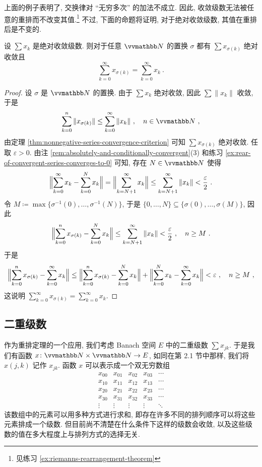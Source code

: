 上面的例子表明了, 交换律对 ``无穷多次'' 的加法不成立. 因此, 收敛级数无法被任意的重排而不改变其值.\footnote{见练习 \ref{ex:riemanns-rearrangement-theorem}} 不过, 下面的命题将证明, 对于绝对收敛级数, 其值在重排后是不变的.

\begin{theorem}\label{thm:rearrangement-theorem}
    设 \(\sum x_k\) 是绝对收敛级数. 则对于任意 \(\N\) 的置换 \(\sigma\) 都有 \(\sum x_{\sigma(k)}\) 绝对收敛且
    \[
        \sum_{k = 0}^\infty x_{\sigma(k)} = \sum_{k = 0}^\infty x_k\ .
    \]
\end{theorem}

\begin{proof}
    设 \(\sigma\) 是 \(\N\) 的置换. 由于 \(\sum x_k\) 绝对收敛, 因此 \(\sum \|x_k\|\) 收敛, 于是
    \[
        \sum_{k = 0}^n \|x_{\sigma(k)}\| \leq \sum_{k = 0}^\infty \|x_k\|\ ,\quad n \in \N\ ,
    \]
    由定理 \ref{thm:nonnegative-series-convergence-criterion} 可知 \(\sum x_{\sigma(k)}\) 绝对收敛. 任取 \(\varepsilon > 0\). 由注 \ref{rem:absolutely-and-conditionally-convergent}(3) 和练习 \ref{ex:rear-of-convergent-series-converges-to-0} 可知, 存在 \(N \in \N\) 使得
    \[
        \Bigl\| \sum_{k = 0}^\infty x_k - \sum_{k = 0}^N x_k \Bigr\| = \Bigl\| \sum_{k = N + 1}^\infty x_k \Bigr\| \leq \sum_{k = N + 1}^\infty \|x_k\| < \frac{\varepsilon}{2}\ .
    \]
    令 \(M \coloneqq \max\bigl\{ \sigma^{- 1}(0), \ldots, \sigma^{- 1}(N) \bigr\}\), 于是 \(\{0, \ldots, N\} \subseteq \bigl\{ \sigma(0), \ldots, \sigma(M) \bigr\}\), 因此
    \[
        \Bigl\| \sum_{k = 0}^n x_{\sigma(k)} - \sum_{k = 0}^N x_k \Bigr\| \leq \sum_{k = N + 1}^\infty \|x_k\| < \frac{\varepsilon}{2}\ ,\quad n \geq M\ .
    \]
    于是
    \[
        \Bigl\| \sum_{k = 0}^n x_{\sigma(k)} - \sum_{k = 0}^\infty x_k \Bigr\| \leq \Bigl\| \sum_{k = 0}^n x_{\sigma(k)} - \sum_{k = 0}^N x_k \Bigr\| + \Bigl\| \sum_{k = 0}^N x_k - \sum_{k = 0}^\infty x_k \Bigr\| < \varepsilon\ ,\quad n \geq M\ ,
    \]
    这说明 \(\sum_{k = 0}^\infty x_{\sigma(k)} = \sum_{k = 0}^\infty x_k\).
\end{proof}

\subsection{二重级数}

作为重排定理的一个应用, 我们考虑 Banach 空间 \(E\) 中的二重级数 \(\sum x_{j k}\). 于是我们有函数 \(x \colon \N \times \N \to E\), 如同在第 2.1 节中那样, 我们将 \(x(j, k)\) 记作 \(x_{j k}\). 函数 \(x\) 可以表示成一个双无穷数组
\[
    \begin{matrix}
        x_{0 0} & x_{0 1} & x_{0 2} & x_{0 3} & \cdots \\
        x_{1 0} & x_{1 1} & x_{1 2} & x_{1 3} & \cdots \\
        x_{2 0} & x_{2 1} & x_{2 2} & x_{2 3} & \cdots \\
        x_{3 0} & x_{3 1} & x_{3 2} & x_{3 3} & \cdots \\
        \vdots  & \vdots  & \vdots  & \vdots  & \ddots
    \end{matrix}
\]
该数组中的元素可以用多种方式进行求和, 即存在许多不同的排列顺序可以将这些元素排成一个级数. 但目前尚不清楚在什么条件下这样的级数会收敛, 以及这些级数的值在多大程度上与排列方式的选择无关.

